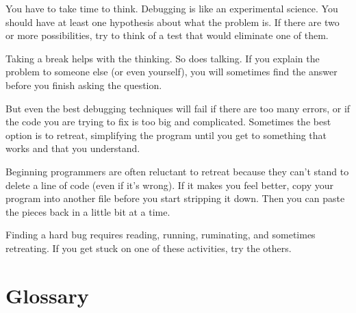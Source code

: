\documentclass[10pt]{book}
\begin{document}

You have to take time to think.  Debugging is like an
experimental science.  You should have at least one hypothesis about
what the problem is.  If there are two or more possibilities, try to
think of a test that would eliminate one of them.

Taking a break helps with the thinking.  So does talking.
If you explain the problem to someone else (or even yourself), you
will sometimes find the answer before you finish asking the question.

But even the best debugging techniques will fail if there are too many
errors, or if the code you are trying to fix is too big and
complicated.  Sometimes the best option is to retreat, simplifying the
program until you get to something that works and that you
understand.

Beginning programmers are often reluctant to retreat because
they can't stand to delete a line of code (even if it's wrong).
If it makes you feel better, copy your program into another file
before you start stripping it down.  Then you can paste the pieces
back in a little bit at a time.

Finding a hard bug requires reading, running, ruminating, and
sometimes retreating.  If you get stuck on one of these activities,
try the others.


\section{Glossary}
\end{document}
